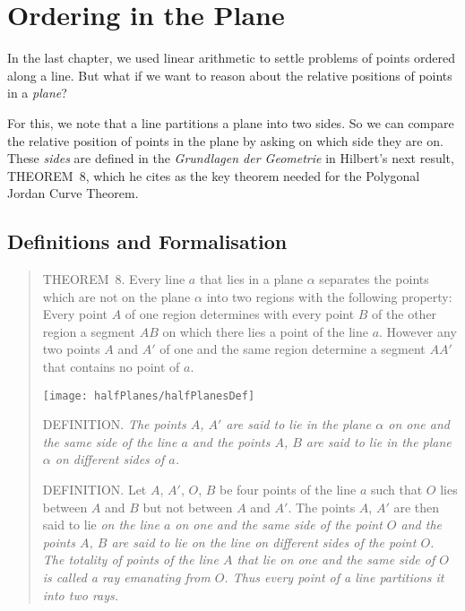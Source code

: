 \chapter{Ordering in the Plane}\label{chapter:HalfPlanes}
In the last chapter, we used linear arithmetic to settle problems of points ordered along a line. But what if we want to reason about the relative positions of points in a \emph{plane}? 

For this, we note that a line partitions a plane into two sides. So we can compare the relative position of points in the plane by asking on which side they are on. These \emph{sides} are defined in the \emph{Grundlagen der Geometrie} in Hilbert's next result, THEOREM~8, which he cites as the key theorem needed for the Polygonal Jordan Curve Theorem.

\section{Definitions and Formalisation}
\begin{quotation}
THEOREM~8. Every line $a$ that lies in a plane $\alpha$ separates the points which are not on the plane $\alpha$ into two regions with the following property: Every point $A$ of one region determines with every point $B$ of the other region a segment $AB$ on which there lies a point of the line $a$. However any two points $A$ and $A'$ of one and the same region determine a segment $AA'$ that contains no point of $a$.

\begin{center}\texttt{[image: halfPlanes/halfPlanesDef]}\end{center}

DEFINITION. \emph{The points $A$, $A'$ are said to lie in the plane $\alpha$ on one and the same side of the line $a$ and the points $A$, $B$ are said to lie in the plane $\alpha$ on different sides of $a$.}

DEFINITION. Let $A$, $A'$, $O$, $B$ be four points of the line $a$ such that $O$ lies between $A$ and $B$ but not between $A$ and $A'$. The points $A$, $A'$ are then said to lie \emph{on the line $a$ on one and the same side of the point $O$ and the points $A$, $B$ are said to lie on the line on different sides of the point $O$. The totality of points of the line $A$ that lie on one and the same side of $O$ is called a \emph{ray} emanating from $O$. Thus every point of a line partitions it into two rays.}

\end{quotation}

